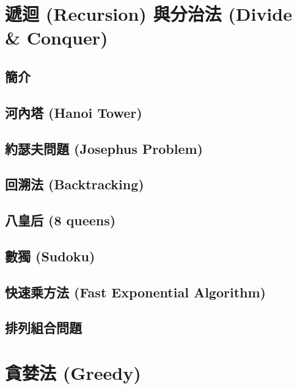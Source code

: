 \documentclass[12pt,a4paper,oneside]{report}
\begin{document}
\begin{CJK}{UTF8}{bkai}
\section{遞迴 (Recursion) 與分治法 (Divide \& Conquer)}

\subsection{簡介}

\subsection{河內塔 (Hanoi Tower)}
\subsection{約瑟夫問題 (Josephus Problem)}
\subsection{回溯法 (Backtracking)}
\subsection{八皇后 (8 queens)}
\subsection{數獨 (Sudoku)}
\subsection{快速乘方法 (Fast Exponential Algorithm)}
\subsection{排列組合問題}

\section{貪婪法 (Greedy)}


\end{CJK}
\end{document}
